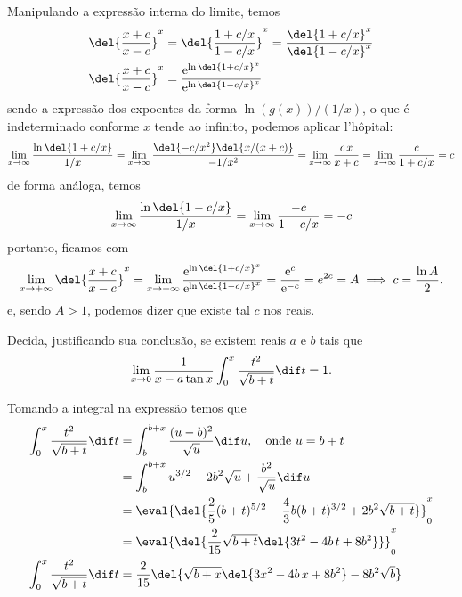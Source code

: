 \documentclass{IMTexam}
\begin{document}
\begin{questions}
        \begin{solution}
            Manipulando a expressão interna do limite, temos
            \begin{align*}
                \del{\dfrac{x+c}{x-c}}^x&=\del{\dfrac{1+c/x}{1-c/x}}^x=\dfrac{\del{1+c/x}^x}{\del{1-c/x}^x}\\
                \del{\dfrac{x+c}{x-c}}^x&=\dfrac{\mathrm{e}^{\ln\del{1+c/x}^x}}{\mathrm{e}^{\ln\del{1-c/x}^x}}
            \end{align*}
            sendo a expressão dos expoentes da forma $\ln(g(x))/(1/x)$, o que é indeterminado conforme $x$ tende ao infinito, podemos aplicar l'hôpital:
            \[ \lim\limits_{x\to\infty}\dfrac{\ln\del{1+c/x}}{1/x}=\lim\limits_{x\to\infty}\dfrac{\del{-c/x^2}\del{x/(x+c)}}{-1/x^2}=\lim\limits_{x\to\infty}\dfrac{c\,x}{x+c}=\lim\limits_{x\to\infty}\dfrac{c}{1+c/x}=c \]
            de forma análoga, temos
            \[ \lim\limits_{x\to\infty}\dfrac{\ln\del{1-c/x}}{1/x}=\lim\limits_{x\to\infty}\dfrac{-c}{1-c/x}=-c \]
            portanto, ficamos com
            \[
            \lim\limits_{x\to+\infty}\del{\dfrac{x+c}{x-c}}^x=\lim\limits_{x\to+\infty}\dfrac{\mathrm{e}^{\ln\del{1+c/x}^x}}{\mathrm{e}^{\ln\del{1-c/x}^x}}=\dfrac{\mathrm{e}^{c}}{\mathrm{e}^{-c}}=e^{2c}=A\implies
            c=\dfrac{\ln A}{2}. \]
            e, sendo $A>1$, podemos dizer que existe tal $c$ nos reais.
        \end{solution}

        \question Decida, justificando sua conclusão, se existem reais $a$ e $b$ tais que
        \[ \lim\limits_{x\to0}\dfrac{1}{x-a\tan x}\int_0^x \dfrac{t^2}{\sqrt{b+t}}\dif t=1. \]

        \begin{solution}
            Tomando a integral na expressão temos que
            \begin{align*}
                \int_0^x \dfrac{t^2}{\sqrt{b+t}}\dif t&=\int_b^{b+x} \dfrac{(u-b)^2}{\sqrt{u}}\dif u,\quad\textup{onde } u=b+t\\
                &=\int_b^{b+x} u^{3/2}-2b^2\sqrt{u}+\dfrac{b^2}{\sqrt{u}}\dif u\\
                &=\eval{\del{\dfrac{2}{5}(b+t)^{5/2}-\dfrac{4}{3}b(b+t)^{3/2}+2b^2\sqrt{b+t}}}_0^{x}\\
                &=\eval{\del{\dfrac{2}{15}\sqrt{b+t}\del{3t^2-4b\,t+8b^2}}}_0^{x}\\
                \int_0^x \dfrac{t^2}{\sqrt{b+t}}\dif t&=\dfrac{2}{15}\del{\sqrt{b+x}\del{3x^2-4b\,x+8b^2}-8b^2\sqrt{b}}
            \end{align*}


\end{solution}
\end{questions}
\end{document}
